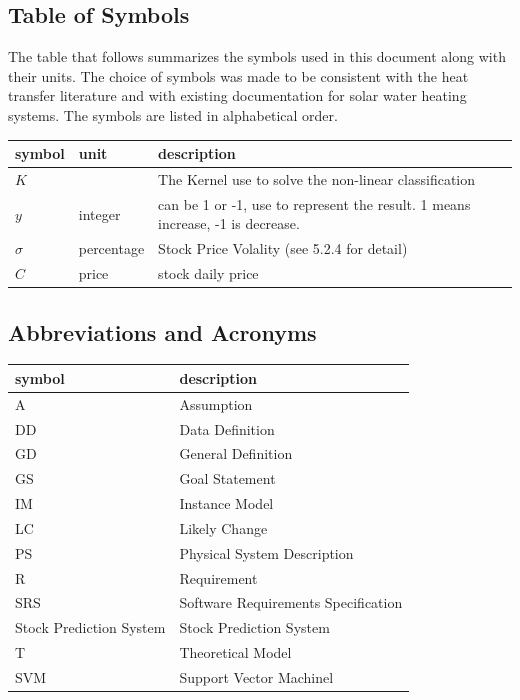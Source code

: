 \documentclass[12pt]{article}
\newcommand{\progname}{Stock Prediction System} %
\begin{document}
\subsection{Table of Symbols}

The table that follows summarizes the symbols used in this document along with
their units.  The choice of symbols was made to be consistent with the heat
transfer literature and with existing documentation for solar water heating
systems.  The symbols are listed in alphabetical order.

\renewcommand{\arraystretch}{1.2}
\noindent \begin{longtable*}{l l p{12cm}} \toprule
\textbf{symbol} & \textbf{unit} & \textbf{description}\\
\midrule 
$K$ & \si[per-mode=symbol] {} & The Kernel use to solve the non-linear classification\\
$y$ & \si[per-mode=symbol] {integer} & can be 1 or -1, use to represent the result. 1 means increase, -1 is decrease.\\
$\sigma$ & \si[per-mode=symbol] {percentage} & Stock Price Volality (see 5.2.4 for detail)\\ 
$C$ & \si[per-mode=symbol] {price} & stock daily price\\ 
\bottomrule
\end{longtable*}


\subsection{Abbreviations and Acronyms}

\renewcommand{\arraystretch}{1.2}
\begin{tabular}{l l} 
  \toprule		
  \textbf{symbol} & \textbf{description}\\
  \midrule 
  A & Assumption\\
  DD & Data Definition\\
  GD & General Definition\\
  GS & Goal Statement\\
  IM & Instance Model\\
  LC & Likely Change\\
  PS & Physical System Description\\
  R & Requirement\\
  SRS & Software Requirements Specification\\
  \progname{} & {Stock Prediction System}\\
  T & Theoretical Model\\
  SVM & Support Vector Machinel\\
  \bottomrule
\end{tabular}\\
\end{document}
